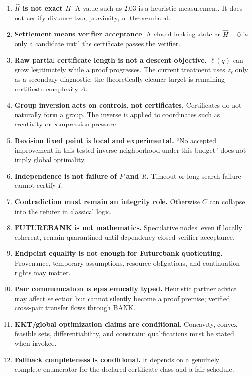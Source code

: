 \documentclass[11pt]{article}
\newcommand{\Hhat}{\widehat H}
\begin{document}
\begin{enumerate}[label=\textbf{C\arabic*.},leftmargin=2.6em]
\item \textbf{$\Hhat$ is not exact $H$.} A value such as $2.03$ is a heuristic measurement. It does not certify distance two, proximity, or theoremhood.
\item \textbf{Settlement means verifier acceptance.} A closed-looking state or $\Hhat=0$ is only a candidate until the certificate passes the verifier.
\item \textbf{Raw partial certificate length is not a descent objective.} $\ell(q)$ can grow legitimately while a proof progresses. The current treatment uses $z_\ell$ only as a secondary diagnostic; the theoretically cleaner target is remaining certificate complexity $\Lambda$.
\item \textbf{Group inversion acts on controls, not certificates.} Certificates do not naturally form a group. The inverse is applied to coordinates such as creativity or compression pressure.
\item \textbf{Revision fixed point is local and experimental.} ``No accepted improvement in this tested inverse neighborhood under this budget'' does not imply global optimality.
\item \textbf{Independence is not failure of $P$ and $R$.} Timeout or long search failure cannot certify $I$.
\item \textbf{Contradiction must remain an integrity role.} Otherwise $C$ can collapse into the refuter in classical logic.
\item \textbf{FUTUREBANK is not mathematics.} Speculative nodes, even if locally coherent, remain quarantined until dependency-closed verifier acceptance.
\item \textbf{Endpoint equality is not enough for Futurebank quotienting.} Provenance, temporary assumptions, resource obligations, and continuation rights may matter.
\item \textbf{Pair communication is epistemically typed.} Heuristic partner advice may affect selection but cannot silently become a proof premise; verified cross-pair transfer flows through BANK.
\item \textbf{KKT/global optimization claims are conditional.} Concavity, convex feasible sets, differentiability, and constraint qualifications must be stated when invoked.
\item \textbf{Fallback completeness is conditional.} It depends on a genuinely complete enumerator for the declared certificate class and a fair schedule.

\end{enumerate}
\end{document}
